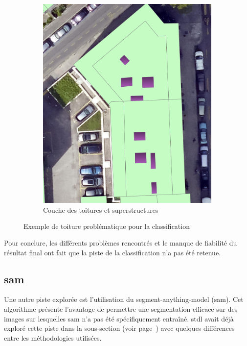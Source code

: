 \begin{figure}[H]
\begin{subfigure}[b]{0.475\textwidth}
        \includegraphics[width=\textwidth]{02-main/figures/ch3/ch3_piste_exploree_classification_09_resultats_image__toiture_sp.png}
        \caption{Couche des toitures et superstructures}
        \label{fig:ch3_piste_exploree_classification_09_resultats_image__toiture_sp}
    \end{subfigure}

    \caption{Exemple de toiture problématique pour la classification}
    \label{fig:piste_exploree_classification_resultats_explications}
\end{figure}

Pour conclure, les différents problèmes rencontrés et le manque de fiabilité du résultat final ont fait que la piste de la classification n'a pas été retenue.


\newpage
\subsection{\acrshort{sam}}
Une autre piste explorée est l'utilisation du segment-anything-model (\acrshort{sam}). Cet algorithme présente l'avantage de permettre une segmentation efficace sur des images sur lesquelles \acrshort{sam} n'a pas été spécifiquement entraîné. \acrshort{stdl} avait déjà exploré cette piste dans la sous-section \textit{} (voir page~\pageref{subsec:stdl_analyse}) avec quelques différences entre les méthodologies utilisées.

